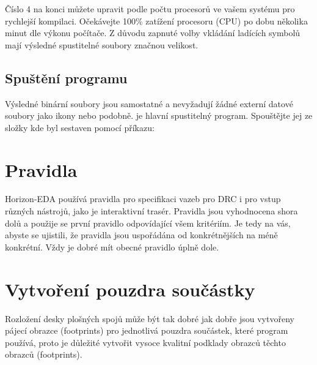 \documentclass[letterpaper,10pt,czech]{sphinxmanual}
\begin{document}
Číslo 4 na konci můžete upravit podle počtu procesorů ve vašem systému pro rychlejší kompilaci. Očekávejte 100\% zatížení procesoru (CPU) po dobu několika minut dle výkonu počítače. Z důvodu zapnuté volby vkládání ladících symbolů mají výsledné spustitelné soubory značnou velikost.


\section{Spuštění programu}
\label{\detokenize{build-linux:spusteni-programu}}
Výsledné binární soubory jsou samostatné a nevyžadují žádné externí
datové soubory jako ikony nebo podobně.
 je hlavní spustitelný program. Spouštějte jej ze složky kde byl sestaven pomocí příkazu:

\begin{sphinxVerbatim}[commandchars=\\\{\}]
\end{sphinxVerbatim}


\chapter{Pravidla}
\label{\detokenize{rules:pravidla}}\label{\detokenize{rules::doc}}
Horizon-EDA používá pravidla pro specifikaci vazeb pro DRC i pro vstup různých nástrojů, jako je interaktivní trasér. Pravidla jsou vyhodnocena shora dolů a použije se první pravidlo odpovídající všem kritériím. Je tedy na vás, abyste se ujistili, že pravidla jsou uspořádána od konkrétnějších na méně konkrétní. Vždy je dobré mít obecné pravidlo úplně dole.


\chapter{Vytvoření pouzdra součástky}
\label{\detokenize{create-package:vytvoreni-pouzdra-soucastky}}\label{\detokenize{create-package::doc}}
Rozložení desky plošných spojů může být tak dobré jak dobře jsou vytvořeny pájecí obrazce (footprints) pro jednotlivá pouzdra součástek, které program používá, proto je důležité vytvořit vysoce kvalitní podklady obrazců těchto obrazců (footprints).
\end{document}

